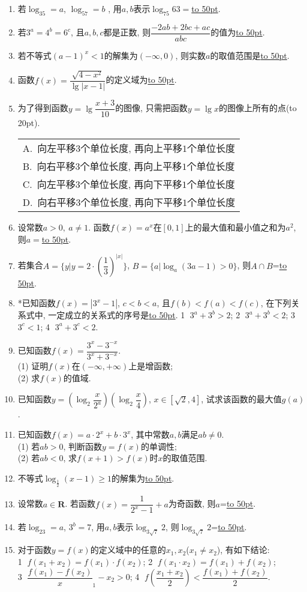 \documentclass[10pt,a4paper]{article}
\newcommand{\blank}[1]{\underline{\hbox to #1pt{}}}
\newcommand{\bracket}[1]{(\hbox to #1pt{})}
\newcommand{\onech}[4]{\par\begin{tabular}{p{.9\textwidth}}
A.~#1\\
B.~#2\\
C.~#3\\
D.~#4
\end{tabular}}
\begin{document}
\begin{enumerate}[1.]
\item 若$\log_35=a$, $\log_57=b$ , 用$a,b$表示$\log_{75}63=$\blank{50}.
\item 若$3^a=4^b=6^c$, 且$a,b,c$都是正数, 则$\dfrac{-2ab+2bc+ac}{abc}$的值为\blank{50}.
\item 若不等式$(a-1)^x<1$的解集为$(-\infty,0)$, 则实数$a$的取值范围是\blank{50}.
\item 函数$f(x)=\dfrac{\sqrt{4-x^2}}{\lg |x-1|}$的定义域为\blank{50}.
\item 为了得到函数$y=\lg\dfrac{x+3}{10}$的图像, 只需把函数$y=\lg x$的图像上所有的点\bracket{20}.
\onech{向左平移$3$个单位长度, 再向上平移$1$个单位长度}{向右平移$3$个单位长度, 再向上平移$1$个单位长度}{向左平移$3$个单位长度, 再向下平移$1$个单位长度}{向右平移$3$个单位长度, 再向下平移$1$个单位长度}
\item 设常数$a>0,\ a\ne 1$. 函数$f(x)=a^x$在$[0,1]$上的最大值和最小值之和为$a^2$, 则$a=$\blank{50}.
\item 若集合$A=\{y|y=2\cdot (\dfrac 13)^{|x|}\}$, $B=\{ a|\log_a(3a-1)>0\}$, 则$A\cap B$=\blank{50}.
\item *已知函数$f(x)=|3^x-1|$, $c<b<a$, 且$f(b)<f(a)<f(c)$, 在下列关系式中, 一定成立的关系式的序号是\blank{50}.
\textcircled{1} $3^a+3^b>2$; \textcircled{2} $3^a+3^b<2$; \textcircled{3} $3^c<1$; \textcircled{4} $3^a+3^c<2$.
\item 已知函数$f(x)=\dfrac{3^x-3^{-x}}{3^x+3^{-x}}$.\\
(1) 证明$f(x)$在$(-\infty,+\infty)$上是增函数;\\
(2) 求$f(x)$的值域.
\item 已知函数$y=(\log_2\dfrac x{2^a})(\log_2\dfrac x4)$, $x\in [\sqrt 2,4]$, 试求该函数的最大值$g(a)$.
\item 已知函数$f(x)=a\cdot 2^x+b\cdot 3^x$, 其中常数$a,b$满足$ab\ne 0$.\\
(1) 若$ab>0$, 判断函数$y=f(x)$的单调性;\\
(2) 若$ab<0$, 求$f(x+1)>f(x)$时$x$的取值范围.
\item 不等式$\log_{\frac 12}(x-1)\ge 1$的解集为\blank{50}.
\item 设常数$a\in \mathbf{R}$. 若函数$f(x)=\dfrac 1{2^x-1}+a$为奇函数, 则$a$=\blank{50}.
\item 若$\log_23=a$, $3^b=7$, 用$a,b$表示$\log_{3\sqrt 7}2$, 则$\log_{3\sqrt 7}2$=\blank{50}.
\item 对于函数$y=f(x)$的定义域中的任意的$x_1,x_2$($x_1\ne x_2$), 有如下结论:\\
\textcircled{1} $f(x_1+x_2)=f(x_1)\cdot f(x_2)$; \textcircled{2} $f(x_1\cdot x_2)=f(x_1)+f(x_2)$;\\ \textcircled{3} $\dfrac{f(x_1)-f(x_2)}x_1-x_2>0$; \textcircled{4} $f(\dfrac{x_1+x_2}2)<\dfrac{f(x_1)+f(x_2)}2$. 

\end{enumerate}
\end{document}
